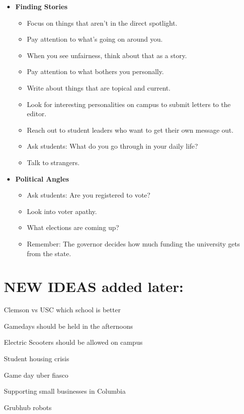 \documentclass{article}
\begin{document}
\begin{itemize}
\item
  \textbf{Finding Stories}

  \begin{itemize}
  \item
    Focus on things that aren't in the direct spotlight.
  \item
    Pay attention to what's going on around you.
  \item
    When you see unfairness, think about that as a story.
  \item
    Pay attention to what bothers you personally.
  \item
    Write about things that are topical and current.
  \item
    Look for interesting personalities on campus to submit letters to
    the editor.
  \item
    Reach out to student leaders who want to get their own message out.
  \item
    Ask students: What do you go through in your daily life?
  \item
    Talk to strangers.
  \end{itemize}
\item
  \textbf{Political Angles}

  \begin{itemize}
  \item
    Ask students: Are you registered to vote?
  \item
    Look into voter apathy.
  \item
    What elections are coming up?
  \item
    Remember: The governor decides how much funding the university gets
    from the state.
  \end{itemize}
\end{itemize}

\section*{NEW IDEAS added later:}

Clemson vs USC which school is better

Gamedays should be held in the afternoons

Electric Scooters should be allowed on campus

Student housing crisis

Game day uber fiasco

Supporting small businesses in Columbia

Grubhub robots
\end{document}
